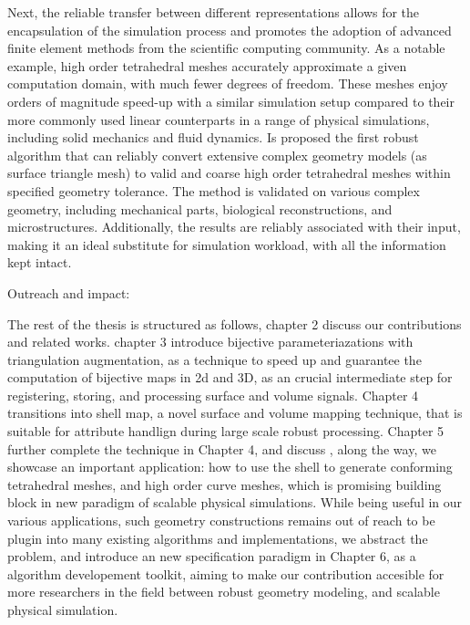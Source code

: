 %
Next, the reliable transfer between different representations allows for the encapsulation of the simulation process and promotes the adoption of advanced finite element methods from the scientific computing community. As a notable example, high order tetrahedral meshes accurately approximate a given computation domain, with much fewer degrees of freedom. These meshes enjoy orders of magnitude speed-up with a similar simulation setup compared to their more commonly used linear counterparts in a range of physical simulations, including solid mechanics and fluid dynamics. Is proposed the first robust algorithm that can reliably convert extensive complex geometry models (as surface triangle mesh) to valid and coarse high order tetrahedral meshes within specified geometry tolerance. The method is validated on various complex geometry, including mechanical parts, biological reconstructions, and microstructures. Additionally, the results are reliably associated with their input, making it an ideal substitute for simulation workload, with all the information kept intact. 




% 
Outreach and impact:

% 
The rest of the thesis is structured as follows,
chapter 2 discuss our contributions and related works.
chapter 3 introduce bijective parameteriazations with triangulation augmentation, as a technique to speed up and guarantee the computation of bijective maps in 2d and 3D, as an crucial intermediate step for registering, storing, and processing surface and volume signals.
Chapter 4 transitions into shell map, a novel surface and volume mapping technique, that is suitable for attribute handlign during large scale robust processing. 
Chapter 5 further complete the technique in Chapter 4, and discuss , along the way, we showcase an important application: how to use the shell to generate conforming tetrahedral meshes, and high order curve meshes, which is promising building block in new paradigm of scalable physical simulations. 
While being useful in our various applications, such geometry constructions remains out of reach to be plugin into many existing algorithms and implementations, we abstract the problem, and introduce an new specification paradigm in Chapter 6, as a algorithm developement toolkit, aiming to make our contribution accesible for more researchers in the field between robust geometry modeling, and scalable physical simulation.
